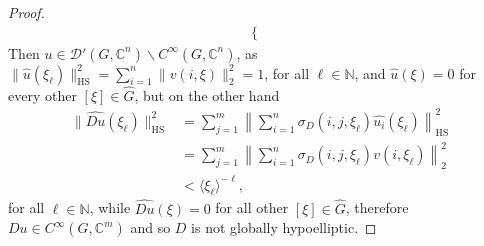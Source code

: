 \documentclass[10pt,a4paper]{amsart}
\newcommand{\C}{\mathbb{C}}
\newcommand{\HS}{\operatorname{HS}}
\newcommand{\N}{\mathbb{N}}
\begin{document}
\begin{proof}
\begin{align*}
\begin{cases}
        \end{cases} 
    \end{align*}
     Then $u\in\mathcal{D}'(G,\C^n)\backslash C^\infty(G,\C^n)$, as $\|\widehat{u}(\xi_\ell)\|_{\HS}^2=\sum_{i=1}^n\|v(i,\xi)\|_2^2=1$, for all $\ell\in\mathbb{N}$, and $\widehat{u}(\xi)=0$ for every other $[\xi]\in \widehat{G}$, but on the other hand
      \begin{align*}
        \|\widehat{{Du}}(\xi_\ell)\|_{\HS}^2&=\sum_{j=1}^{m}\left\|\sum_{i=1}^{n}\sigma_{{D}}(i,j,\xi_\ell)\widehat{u_i}(\xi_\ell)\right\|_{\HS}^2 \\
        &=\sum_{j=1}^{m}\left\|\sum_{i=1}^{n}\sigma_{{D}}(i,j,\xi_\ell)v(i,\xi_\ell)\right\|_{2}^2\\
        &<\langle \xi_\ell\rangle^{-\ell},
    \end{align*}
    for all $\ell\in\N$, while $\widehat{{Du}}(\xi)=0$ for all other $[\xi]\in\widehat{G}$,
    therefore $Du\in C^\infty(G,\C^m)$ and so $D$ is not globally hypoelliptic.
\end{proof}
\end{document}
